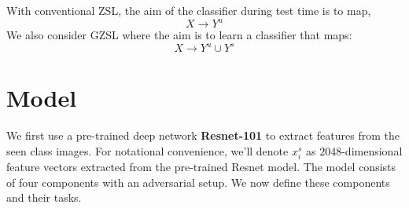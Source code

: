 \documentclass{article}
\begin{document}
With conventional ZSL, the aim of the classifier during test time is to map,
\begin{equation}
X \to Y^u
\end{equation}
We also consider GZSL where the aim is to learn a classifier that maps: 
\begin{equation}
X \to Y^u \cup Y^s
\end{equation}


\section{Model}
\label{model}
We first use a pre-trained deep network \textbf{Resnet-101} to extract features from the seen class images. For notational convenience, we'll denote $x_i^s$ as $2048$-dimensional feature vectors extracted from the pre-trained Resnet model.
The model consists of four components with an adversarial setup. We now define these components and their tasks.
\end{document}
